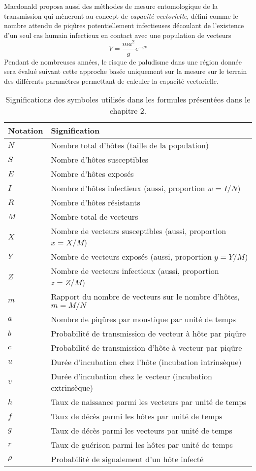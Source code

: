 Macdonald proposa aussi des méthodes de mesure entomologique de la transmission qui mèneront au concept de {\em capacité vectorielle}, défini comme le nombre attendu de piqûres potentiellement infectieuses découlant de l'existence d'un seul cas humain infectieux en contact avec une population de vecteurs 
\begin{equation}
V = \frac{ma^2}{g}e^{-gv}
\end{equation}
Pendant de nombreuses années, le risque de paludisme dans une région donnée sera évalué suivant cette approche basée uniquement sur la mesure sur le terrain des différents paramètres permettant de calculer la capacité vectorielle.


\begin{table}[t]
	\centering
	\caption{Significations des symboles utilisés dans les formules présentées dans le chapitre 2. \vspace{.5em}}
	\label{table:notations}
	\begin{tabular}{L{1.8cm}L{12cm}}
		\hline 
Notation&	Signification \\
\hline
$N$&	Nombre total d’hôtes (taille de la population)\\
$S$&	Nombre d’hôtes susceptibles\\
$E$&	Nombre d’hôtes exposés\\
$I$&	Nombre d’hôtes infectieux (aussi, proportion $w=I/N$)\\
$R$&	Nombre d’hôtes résistants\\
$M$&	Nombre total de vecteurs\\
$X$&	Nombre de vecteurs susceptibles (aussi, proportion $x=X/M$)\\
$Y$&	Nombre de vecteurs exposés (aussi, proportion $y=Y/M$)\\
$Z$&	Nombre de vecteurs infectieux (aussi, proportion $z=Z/M$)\\
$m$&	Rapport du nombre de vecteurs sur le nombre d’hôtes, $m=M/N$\\
$a$&	Nombre de piqûres par moustique par unité de temps\\
$b$&	Probabilité de transmission de vecteur à hôte par piqûre\\
$c$&	Probabilité de transmission d’hôte à vecteur par piqûre\\
$u$&	Durée d’incubation chez l’hôte (incubation intrinsèque)\\
$v$&	Durée d’incubation chez le vecteur (incubation extrinsèque)\\
$h$&	Taux de naissance parmi les vecteurs par unité de temps\\
$f$&	Taux de décès parmi les hôtes par unité de temps\\
$g$&	Taux de décès parmi les vecteurs par unité de temps\\
$r$&	Taux de guérison parmi les hôtes par unité de temps\\
$\rho$&	Probabilité de signalement d’un hôte infecté\\
\hline
	\end{tabular} 
\end{table}




